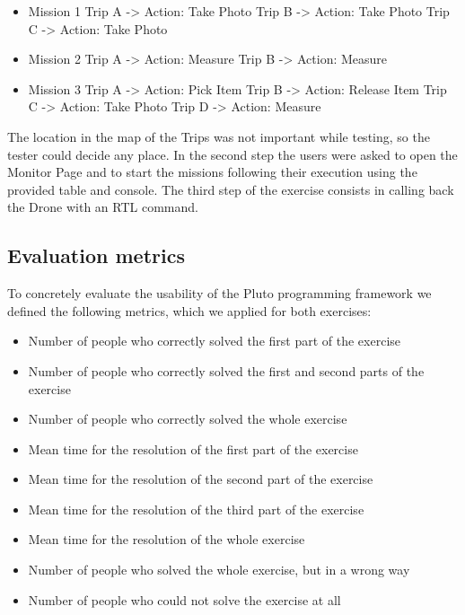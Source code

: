 \begin{itemize}
\item Mission 1
	\subitem Trip A -> Action: Take Photo
    \subitem Trip B -> Action: Take Photo
    \subitem Trip C -> Action: Take Photo
\item Mission 2
	\subitem Trip A -> Action: Measure
    \subitem Trip B -> Action: Measure
\item Mission 3
	\subitem Trip A -> Action: Pick Item
    \subitem Trip B -> Action: Release Item
    \subitem Trip C -> Action: Take Photo
    \subitem Trip D -> Action: Measure
\end{itemize}

The location in the map of the Trips was not important while testing, so the tester could decide any place.
In the second step the users were asked to open the Monitor Page and to start the missions following their execution using the provided table and console.
The third step of the exercise consists in calling back the Drone with an RTL command.


\subsection{Evaluation metrics}\label{metrics}

To concretely evaluate the usability of the Pluto programming framework we defined the following metrics, which we applied for both exercises:

\begin{itemize}
\item {Number of people who correctly solved the first part of the exercise}
\item {Number of people who correctly solved the first and second parts of the exercise}
\item {Number of people who correctly solved the whole exercise}
\item {Mean time for the resolution of the first part of the exercise}
\item {Mean time for the resolution of the second part of the exercise}
\item {Mean time for the resolution of the third part of the exercise}
\item {Mean time for the resolution of the whole exercise}
\item {Number of people who solved the whole exercise, but in a wrong way}
\item {Number of people who could not solve the exercise at all}
\end{itemize}

